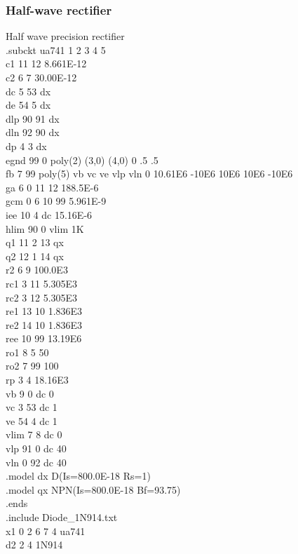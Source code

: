 \documentclass[12pt]{article}
\begin{document}
\subsubsection{Half-wave rectifier}
Half wave precision rectifier\\
.subckt ua741    1  2  3  4  5\\
c1   11 12 8.661E-12\\
c2    6  7 30.00E-12\\
dc    5 53 dx\\
de   54  5 dx\\
dlp  90 91 dx\\
dln  92 90 dx\\
dp    4  3 dx\\
egnd 99  0 poly(2) (3,0) (4,0) 0 .5 .5\\
fb    7 99 poly(5) vb vc ve vlp vln 0 10.61E6 -10E6 10E6 10E6 -10E6\\
ga    6  0 11 12 188.5E-6\\
gcm   0  6 10 99 5.961E-9\\
iee  10  4 dc 15.16E-6\\
hlim 90  0 vlim 1K\\
q1   11  2 13 qx\\
q2   12  1 14 qx\\
r2    6  9 100.0E3\\
rc1   3 11 5.305E3\\
rc2   3 12 5.305E3\\
re1  13 10 1.836E3\\
re2  14 10 1.836E3\\
ree  10 99 13.19E6\\
ro1   8  5 50\\
\newpage
ro2   7 99 100\\
rp    3  4 18.16E3\\
vb    9  0 dc 0\\
vc    3 53 dc 1\\
ve   54  4 dc 1\\
vlim  7  8 dc 0\\
vlp  91  0 dc 40\\
vln   0 92 dc 40\\
.model dx D(Is=800.0E-18 Rs=1)\\
.model qx NPN(Is=800.0E-18 Bf=93.75)\\
.ends\\
.include Diode\_1N914.txt\\
x1 0 2  6 7 4 ua741\\
d2 2 4 1N914\\
\end{document}
